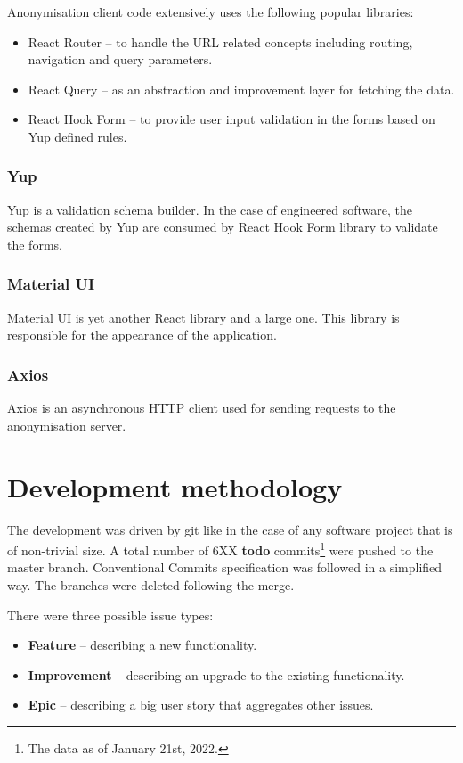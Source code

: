 \documentclass[a4paper,twoside,12pt]{book}
\begin{document}
Anonymisation client code extensively uses the following popular libraries:
\begin{itemize}
\item React Router – to handle the URL related concepts including routing, navigation and query parameters.
\item React Query – as an abstraction and improvement layer for fetching the data.
\item React Hook Form – to provide user input validation in the forms based on Yup defined rules.
\end{itemize}

\subsubsection{Yup}

Yup is a validation schema builder. In the case of engineered software, the schemas created by Yup are consumed by React Hook Form library to validate the forms.

\subsubsection{Material UI}

Material UI is yet another React library and a large one. This library is responsible for the appearance of the application.

\subsubsection{Axios}

Axios is an asynchronous HTTP client used for sending requests to the anonymisation server.

\section{Development methodology}

The development was driven by git like in the case of any software project that is of non-trivial size. A total number of 6XX \textbf{todo} commits\footnote{The data as of January 21st, 2022.} were pushed to the master branch. Conventional Commits specification was followed in a simplified way. The branches were deleted following the merge.

There were three possible issue types:
\begin{itemize}
\item \textbf{Feature} – describing a new functionality.
\item \textbf{Improvement} – describing an upgrade to the existing functionality.
\item \textbf{Epic} – describing a big user story that aggregates other issues. \cite{bib:agile_essentials}
\end{itemize}
\end{document}
